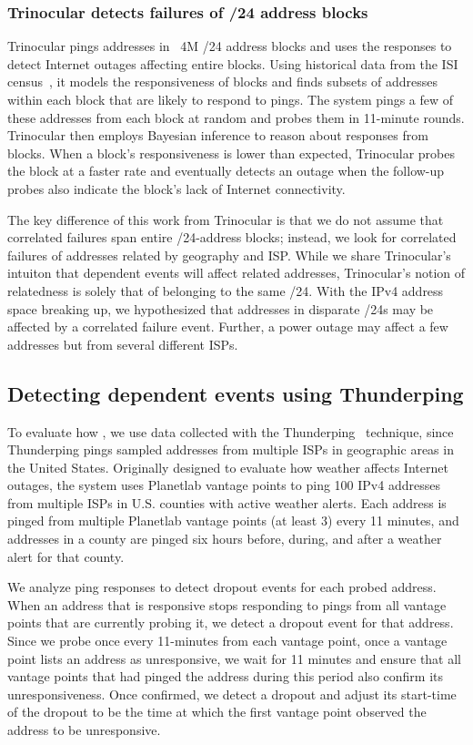 \subsubsection{Trinocular detects failures of /24 address blocks}

Trinocular pings addresses in ~4M /24 address blocks and
uses the responses to detect Internet outages affecting entire blocks. Using historical
data from the ISI census~\cite{}, it models the responsiveness of
blocks and finds subsets of addresses within each block that are
likely to respond to pings. The system pings a few of these addresses
from each block at random and probes them in 11-minute
rounds. Trinocular then employs Bayesian inference to reason about
responses from blocks. When a block's responsiveness is lower than
expected, Trinocular probes the block at a faster rate and eventually
detects an outage when the follow-up probes also indicate the block's
lack of Internet connectivity.

The key difference of this work from Trinocular is that we do not assume
that correlated failures span entire /24-address blocks; instead, we
look for correlated failures of addresses related by geography and
ISP. While we share Trinocular's intuiton that dependent events will
affect related addresses, Trinocular's notion of relatedness is solely
that of belonging to the same /24. With the IPv4 address space
breaking up, we hypothesized that addresses in disparate /24s may be
affected by a correlated failure event. Further, a power outage may
affect a few addresses but from several different ISPs.

\subsection{Detecting dependent events using Thunderping}

To evaluate how , we use data collected with the
Thunderping~\cite{schulman-imc11} technique, since Thunderping pings
sampled addresses from multiple ISPs in geographic areas in the United
States. Originally designed to evaluate how weather affects Internet
outages, the system uses Planetlab vantage points to ping 100 IPv4
addresses from multiple ISPs in U.S. counties with active
weather alerts. Each address is pinged from multiple Planetlab vantage
points (at least 3) every 11 minutes, and addresses in a county are
pinged six hours before, during, and after a weather alert for that
county. 

We analyze ping responses to detect dropout events for each probed
address. When an address that is responsive stops responding to pings
from all vantage points that are currently probing it, we detect a
dropout event for that address. Since we probe once every 11-minutes
from each vantage point, 
once a vantage point lists an address as unresponsive, we wait for 11 minutes and ensure that
all vantage points that had pinged the address during this period also
confirm its unresponsiveness. Once confirmed, we detect a dropout and
adjust its start-time of the dropout to be the time at which the first
vantage point observed the address to be unresponsive. 

